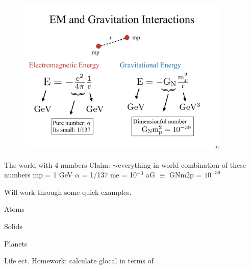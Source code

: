 \begin{figure}[h]
\centering
\includegraphics[width=0.9\textwidth]{./EMandGravity.pdf}
\end{figure}

The world with 4 numbers
Claim: $\sim$everything in world combination of these numbers
mp = 1 GeV 
$\alpha$ = 1/137
me = 10$^{-3}$ \GeV
aG $\equiv$ GNm2p = $10^{-39}$

Will work through some quick examples.

Atoms


Solids


Planets


Life ect.
Homework:
        calculate glocal in terms of 





